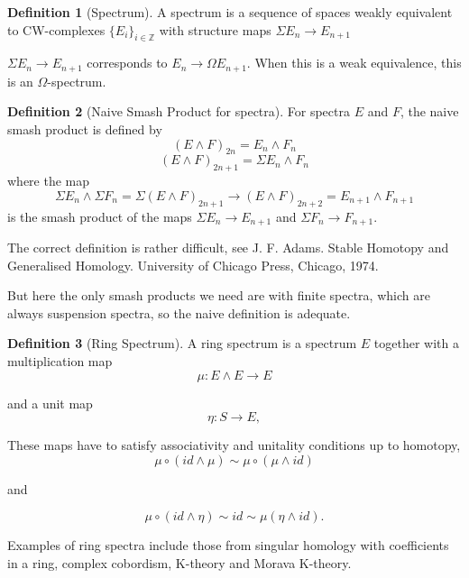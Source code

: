 \documentclass[11pt, oneside]{article}   	%
\theoremstyle{definition}
\newtheorem*{defn}{Definition}
\begin{document}
\begin{defn}[Spectrum]
	A spectrum is a sequence of spaces weakly equivalent to CW-complexes $\{E_i\}_{i\in \mathbb{Z}}$ with structure maps $\Sigma E_n\to E_{n+1}$
\end{defn}

\begin{rmk}
	$\Sigma E_n\to E_{n+1}$ corresponds to $E_n\to \Omega E_{n+1}$. When this is a weak equivalence, this is an $\Omega$-spectrum.
\end{rmk}

\begin{defn}[Naive Smash Product for spectra]
	For spectra $E$ and $F$, the naive smash product is defined by
	\begin{equation}
		(E\wedge F)_{2n}=E_n\wedge F_n
	\end{equation}
	\begin{equation}
		(E\wedge F)_{2n+1}= \Sigma E_n\wedge F_n
	\end{equation}
	where the map
	\begin{equation}
		\Sigma E_n\wedge \Sigma F_n = \Sigma(E\wedge F)_{2n+1}\to (E\wedge F)_{2n+2}=E_{n+1}\wedge F_{n+1}
	\end{equation}
	is the smash product of the maps $\Sigma E_n\to E_{n+1}$ and $\Sigma F_n\to F_{n+1}$.
\end{defn}

\begin{rmk}
	The correct definition is rather difficult, see J. F. Adams. Stable Homotopy and Generalised Homology. University of Chicago Press, Chicago, 1974.

	But here the only smash products we need are with finite spectra,
which are always suspension spectra, so the naive definition is
adequate.
\end{rmk}

\begin{defn}[Ring Spectrum]
	A ring spectrum is a spectrum $E$ together with a multiplication map
	\begin{equation}
		\mu: E\wedge E\to E
	\end{equation}

	and a unit map
	\begin{equation}
		\eta:S\to E,
	\end{equation}

	These maps have to satisfy associativity and unitality conditions up to homotopy,
	\begin{equation}
		\mu\circ (id\wedge \mu)\sim \mu\circ(\mu\wedge id)
	\end{equation}

	and

	\begin{equation}
		\mu\circ(id\wedge \eta)\sim id\sim \mu(\eta\wedge id).
	\end{equation}

	Examples of ring spectra include those from singular homology with coefficients in a ring, complex cobordism, K-theory and Morava K-theory.
\end{defn}
\end{document}
